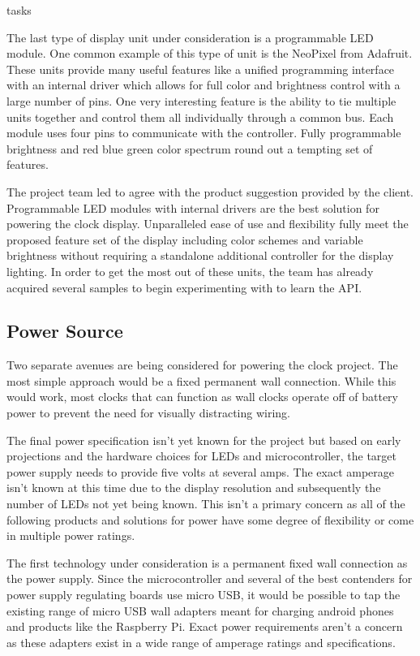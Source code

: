 tasks\documentclass[onecolumn, draftclsnofoot,10pt, compsoc]{IEEEtran}
\begin{document}
The last type of display unit under consideration is a programmable LED module.
One common example of this type of unit is the NeoPixel from Adafruit. \cite{led3}
These units provide many useful features like a unified programming interface with an internal driver which allows for full color and brightness control with a large number of pins.
One very interesting feature is the ability to tie multiple units together and control them all individually through a common bus.
Each module uses four pins to communicate with the controller.
Fully programmable brightness and red blue green color spectrum round out a tempting set of features.

The project team led to agree with the product suggestion provided by the client.
Programmable LED modules with internal drivers are the best solution for powering the clock display.
Unparalleled ease of use and flexibility fully meet the proposed feature set of the display including color schemes and variable brightness without requiring a standalone additional controller for the display lighting.
In order to get the most out of these units, the team has already acquired several samples to begin experimenting with to learn the API.

\subsection{Power Source}

Two separate avenues are being considered for powering the clock project.
The most simple approach would be a fixed permanent wall connection.
While this would work, most clocks that can function as wall clocks operate off of battery power to prevent the need for visually distracting wiring.

The final power specification isn’t yet known for the project but based on early projections and the hardware choices for LEDs and microcontroller, the target power supply needs to provide five volts at several amps.
The exact amperage isn’t known at this time due to the display resolution and subsequently the number of LEDs not yet being known.
This isn’t a primary concern as all of the following products and solutions for power have some degree of flexibility or come in multiple power ratings.

The first technology under consideration is a permanent fixed wall connection as the power supply.
Since the microcontroller and several of the best contenders for power supply regulating boards use micro USB, it would be possible to tap the existing range of micro USB wall adapters meant for charging android phones and products like the Raspberry Pi.
Exact power requirements aren’t a concern as these adapters exist in a wide range of amperage ratings and specifications.
\end{document}
